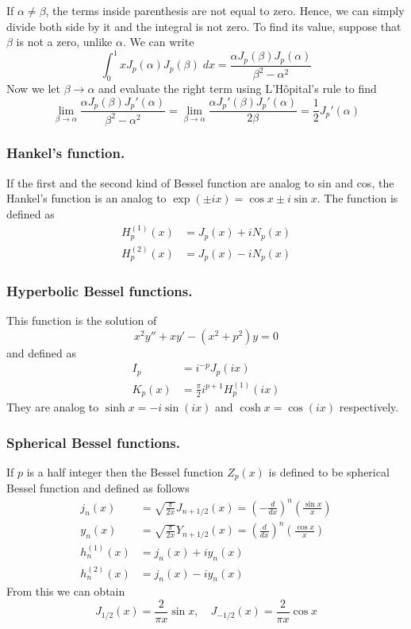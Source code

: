 \documentclass[../main.tex]{subfiles}
\begin{document}
If $\alpha\neq\beta$, the terms inside parenthesis are not equal to zero. Hence, we can simply divide both side by it and the integral is not zero. To find its value, suppose that $\beta$ is not a zero, unlike $\alpha$. We can write 
\begin{equation*}
    \int_{0}^{1}xJ_p(\alpha)J_p(\beta)\;dx=\frac{\alpha J_p(\beta)J_p(\alpha)}{\beta^2-\alpha^2}
\end{equation*}
Now we let $\beta\rightarrow\alpha$ and evaluate the right term using  L'Hôpital's rule to find 
\begin{equation*}
    \lim_{\beta\rightarrow\alpha}\frac{\alpha J_p(\beta)J_p'(\alpha)}{\beta^2-\alpha^2} =\lim_{\beta\rightarrow\alpha}\frac{\alpha J_p'(\beta)J_p'(\alpha)}{2\beta}=\frac{1}{2}J_p'(\alpha)
\end{equation*}


\subsubsection*{Hankel's function.} If the first and the second kind of Bessel function are analog to sin and cos, the Hankel's function is an analog to $\exp(\pm ix)=\cos x \pm i\sin x$. The function is defined as  
\begin{align*}
    H_p^{(1)}(x)&=J_p(x)+iN_p(x)\\
    H_p^{(2)}(x)&=J_p(x)-iN_p(x)
\end{align*}

\subsubsection*{Hyperbolic Bessel functions.} This function is the solution of 
\begin{equation*}
    x^2y''+xy'-(x^2+p^2)y=0
\end{equation*}
and defined as 
\begin{align*}
    I_p&=i^{-p}J_p(ix)\\
    K_p(x)&=\frac{\pi}{2}i^{p+1}H_p^{(1)}(ix)
\end{align*}
They are analog to $\sinh x= -i\sin (ix)$ and $\cosh x=\cos (ix)$ respectively.

\subsubsection*{Spherical Bessel functions.} If $p$ is a half integer
then the Bessel function $Z_p(x)$ is defined to be spherical Bessel function and defined as follows
\begin{align*}
    j_n(x)&=\sqrt{\frac{\pi}{2x}}J_{n+1/2}(x)=\left(-\frac{d}{dx}\right)^n\left(\frac{\sin x}{x}\right)\\
    y_n(x)&=\sqrt{\frac{\pi}{2x}}Y_{n+1/2}(x)=\left(\frac{d}{dx}\right)^n\left(\frac{\cos x}{x}\right)\\
    h_n^{(1)}(x)&=j_n(x)+iy_n(x)\\
    h_n^{(2)}(x)&=j_n(x)-iy_n(x)
\end{align*}
From this we can obtain 
\begin{equation*}
    J_{1/2}(x)=\frac{2}{\pi x}\sin x, \quad J_{-1/2}(x)=\frac{2}{\pi x}\cos x
\end{equation*} 
\end{document}

